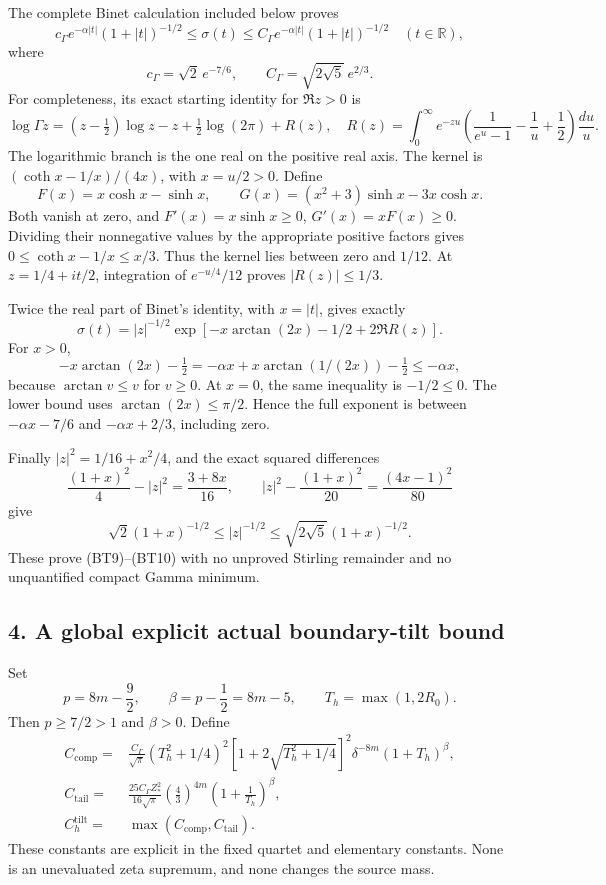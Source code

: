 The complete Binet calculation included below proves \[
\boxed{
c_\Gamma e^{-\alpha|t|}(1+|t|)^{-1/2}
\le \sigma(t)\le
C_\Gamma e^{-\alpha|t|}(1+|t|)^{-1/2}
\quad(t\in\mathbb{R}),}
\tag{BT9}
\] where \[
c_\Gamma=\sqrt2\,e^{-7/6},\qquad
C_\Gamma=\sqrt{2\sqrt5}\,e^{2/3}.
\tag{BT10}
\] For completeness, its exact starting identity for \(\Re z>0\) is \[
\log\Gamma z=(z-\tfrac12)\log z-z+\tfrac12\log(2\pi)+R(z),
\quad
R(z)=\int_0^\infty e^{-zu}
 \left(\frac1{e^u-1}-\frac1u+\frac12\right)\frac{du}{u}.
\] The logarithmic branch is the one real on the positive real axis. The kernel is \((\coth x-1/x)/(4x)\), with \(x=u/2>0\). Define \[
F(x)=x\cosh x-\sinh x,\qquad
G(x)=(x^2+3)\sinh x-3x\cosh x.
\] Both vanish at zero, and \(F'(x)=x\sinh x\ge0\), \(G'(x)=xF(x)\ge0\). Dividing their nonnegative values by the appropriate positive factors gives \(0\le\coth x-1/x\le x/3\). Thus the kernel lies between zero and \(1/12\). At \(z=1/4+it/2\), integration of \(e^{-u/4}/12\) proves \(|R(z)|\le1/3\).

Twice the real part of Binet's identity, with \(x=|t|\), gives exactly \[
\sigma(t)=|z|^{-1/2}
 \exp[-x\arctan(2x)-1/2+2\Re R(z)].
\] For \(x>0\), \[
-x\arctan(2x)-\tfrac12
=-\alpha x+x\arctan(1/(2x))-\tfrac12
\le-\alpha x,
\] because \(\arctan v\le v\) for \(v\ge0\). At \(x=0\), the same inequality is \(-1/2\le0\). The lower bound uses \(\arctan(2x)\le\pi/2\). Hence the full exponent is between \(-\alpha x-7/6\) and \(-\alpha x+2/3\), including zero.

Finally \(|z|^2=1/16+x^2/4\), and the exact squared differences \[
\frac{(1+x)^2}{4}-|z|^2=\frac{3+8x}{16},\qquad
|z|^2-\frac{(1+x)^2}{20}=\frac{(4x-1)^2}{80}
\] give \[
\sqrt2(1+x)^{-1/2}\le |z|^{-1/2}
\le\sqrt{2\sqrt5}(1+x)^{-1/2}.
\] These prove (BT9)--(BT10) with no unproved Stirling remainder and no unquantified compact Gamma minimum.

\subsection{4. A global explicit actual boundary-tilt bound}\label{GraphV2:a-global-explicit-actual-boundary-tilt-bound}

Set \[
p=8m-\frac92,\qquad \beta=p-\frac12=8m-5,\qquad
T_h=\max(1,2R_0).
\tag{BT11}
\] Then \(p\ge7/2>1\) and \(\beta>0\). Define \[
\begin{split}
C_{\mathrm{comp}}
={}&\frac{C_\Gamma}{\sqrt\pi}
 (T_h^2+1/4)^2
 [1+2\sqrt{T_h^2+1/4}]^2
 \delta^{-8m}(1+T_h)^\beta,\\
C_{\mathrm{tail}}
={}&\frac{25C_\Gamma Z_*^2}{16\sqrt\pi}
 \left(\frac43\right)^{4m}
 \left(1+\frac1{T_h}\right)^\beta,\\
C_h^{\mathrm{tilt}}
={}&\max(C_{\mathrm{comp}},C_{\mathrm{tail}}).
\end{split}
\tag{BT12}
\] These constants are explicit in the fixed quartet and elementary constants. None is an unevaluated zeta supremum, and none changes the source mass.


